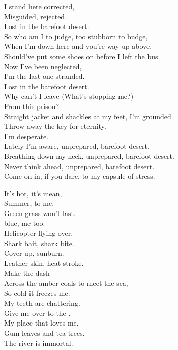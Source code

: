 I stand here corrected, \\
Misguided, rejected. \\
Lost in the barefoot desert. \\

So who am I to judge, too stubborn to budge, \\
When I'm down here and you're way up above. \\
Should've put some shoes on before I left the bus. \\

Now I've been neglected, \\
I'm the last one stranded. \\
Lost in the barefoot desert. \\
Why can't I leave (What's stopping me?) \\
From this prison? \\
Straight jacket and shackles at my feet, I'm grounded. \\
Throw away the key for eternity. \\
I'm desperate. \\

Lately I'm aware, unprepared, barefoot desert. \\
Breathing down my neck, unprepared, barefoot desert. \\
Never think ahead, unprepared, barefoot desert. \\
Come on in, if you dare, to my capsule of stress. \\





It's hot, it's mean, \\
Summer, to me. \\
Green grass won't last. \\
 blue, me too. \\

Helicopter flying over. \\
Shark bait, shark bite. \\
Cover up, sunburn. \\
Leather skin, heat stroke. \\

Make the dash \\
Across the amber coals to meet the sea, \\
So cold it freezes me. \\
My teeth are chattering. \\
Give me over to the . \\
My place that loves me, \\
Gum leaves and tea trees. \\
The river is immortal. \\

